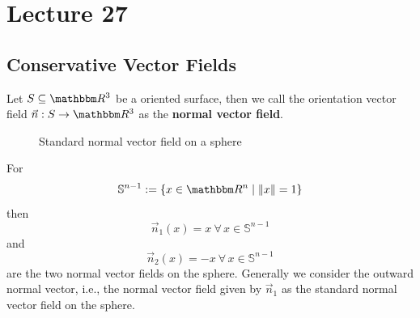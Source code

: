 \documentclass[Analysis-3]{subfiles}
\begin{document}
\chapter*{Lecture 27} %
\setcounter{chapter}{27} %
\setcounter{section}{0}

\section{Conservative Vector Fields}

Let $S \subseteq \R^3$ be a oriented surface, then we call the orientation vector field $\vec{n} : S \to \R^3$ as the \textbf{normal vector field}. 

\begin{Eg}{}{}
    \begin{figure}
        \centering
        \caption{Standard normal vector field on a sphere}\label{fig1:27}
    \end{figure}
    For
    \[
        \mathbb{S}^{n-1} := \{ x \in \R^n \mid \| x \| = 1 \}  
    \] 
    then 
    \[
        \vec{n}_1(x) = x \ \forall \, x \in \mathbb{S}^{n-1}
    \]
    and 
    \[
        \vec{n}_2(x) = -x \ \forall \, x \in \mathbb{S}^{n-1}  
    \]
    are the two normal vector fields on the sphere. Generally we consider the outward normal vector, i.e., the normal vector field given by $\vec{n}_1$ as the standard normal vector field on the sphere.
\end{Eg}
\end{document}
